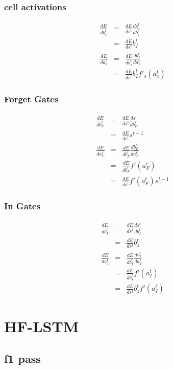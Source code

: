 \documentclass{article}
\begin{document}
\subsubsection{cell activations}
\begin{eqnarray*}
\frac{dE}{db_z^t} &=& \frac{dE}{ds^t} \frac{ds^t}{db_z^t} \\
&=&  \frac{dE}{ds^t}b_{I}^t \\
\frac{dE}{da_z^t}  &=& \frac{dE}{db_z^t}\frac{db_z^t}{da_z^t} \\
&=&  \frac{dE}{ds^t} b_{I}^t f'_s(a_z^t)
\end{eqnarray*}

\subsubsection{Forget Gates}
\begin{eqnarray*}
\frac{dE}{db_{F}^t} &=& \frac{dE}{ds^t} \frac{ds^t}{db_{F}^t} \\
&=& \frac{dE}{ds^t}s^{t-1} \\
\frac{dE}{da_{F}^t} &=& \frac{dE}{db_{F}^t}\frac{db_{F}^t}{da_{F}^t} \\
&=& \frac{dE}{db_{F}^t}f'(a_{F}^t) \\
&=& \frac{dE}{ds^t}f'(a_{F}^t)s^{t-1} 
\end{eqnarray*}

\subsubsection{In Gates}
\begin{eqnarray*}
\frac{dE}{db_{I}^t} &=& \frac{dE}{ds^t} \frac{ds^t}{db_{I}^t} \\
&=& \frac{dE}{ds^t} b_z^t \\
\frac{dE}{da_{I}^t} &=& \frac{dE}{db_{I}^t}\frac{db_{I}^t}{da_{I}^t} \\
&=& \frac{dE}{db_{I}^t}f'(a_{I}^t) \\ 
&=& \frac{dE}{ds^t} b_z^t f'(a_{I}^t)
\end{eqnarray*}

\section{HF-LSTM}

\subsection{f1 pass}
\end{document}
